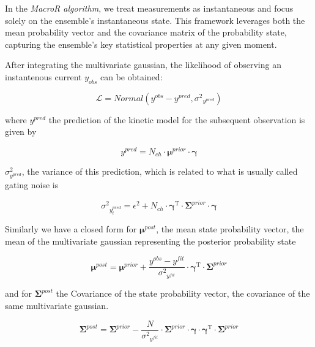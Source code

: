 \documentclass[pdflatex,sn-mathphys-num]{sn-jnl}%
\theoremstyle{thmstyleone}%
\theoremstyle{thmstyletwo}%
\theoremstyle{thmstylethree}%
\begin{document}
In the \textit{MacroR algorithm}, we treat measurements as instantaneous and focus solely on the ensemble's instantaneous state. This framework leverages both the mean probability vector and the covariance matrix of the probability state, capturing the ensemble's key statistical properties at any given moment.

After integrating the multivariate gaussian, the likelihood of observing an instantenous current $y_{obs}$ can be obtained:

\begin{equation}
	\mathcal{L}= Normal \left (y^{obs}-y^{pred}, {\sigma^2}_{y^{pred}} \right)
	\label{eq:macro_likelihood}
\end{equation}

where $y^{pred}$ the prediction of the kinetic model for the subsequent observation is given by

\begin{equation}
	y^{pred} = N_{ch} \cdot \mathbf \mu^{prior} \cdot \mathbf \gamma
	\label{eq:macro_predicted_y}
\end{equation}

$\sigma^2_{y^{pred}}$, the variance of this prediction, which is related to what is usually called gating noise is 

\begin{equation}
	{\sigma^2}_{y^{pred}_{t}}
	= \epsilon^2 +N_{ch} \cdot {\mathbf \gamma}^{\mathrm{T}} \cdot \mathbf \Sigma^{prior} \cdot \mathbf \gamma
	\label{eq:macro_sigma_pred}
	
\end{equation}


Similarly we have a closed form for $\mathbf \mu^{post}$, the mean state probability vector, the mean of the multivariate gaussian representing the posterior probability state 

\begin{equation}
	\mathbf \mu^{post}= \mathbf \mu^{prior} + {\frac {y^{obs} - y^{fit}}{{\sigma^2}_{y^{fit}} }}\cdot {\mathbf \gamma}^\mathrm{T} \cdot \mathbf \Sigma^{prior}
	\label{eq:macro_mean_posterior}
	 
\end{equation}

and for $\mathbf \Sigma^{post}$ the Covariance of the state probability vector, the covariance of the same multivariate gaussian. 
 

\begin{equation}
	\mathbf \Sigma^{post} = \mathbf \Sigma^{prior} - {\frac {N}{{\sigma^2}_{y^{fit}}}}\cdot \mathbf \Sigma^{prior} \cdot \mathbf \gamma \cdot {\mathbf \gamma}^\mathrm{T} \cdot \mathbf \Sigma^{prior}
	\label{eq:macro_cov_posterior}
\end{equation}
\end{document}
